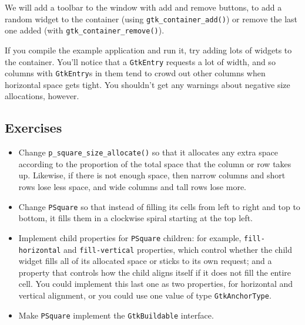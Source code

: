 \documentclass[%
			   halfparskip,smallheadings,pointlessnumbers]%
			   {scrartcl} %
\begin{document}
We will add a toolbar to the window with add and remove buttons, to add a random widget to the container (using \lstinline$gtk_container_add()$) or remove the last one added (with \lstinline$gtk_container_remove()$).

If you compile the example application and run it, try adding lots of widgets to the container. You'll notice that a \lstinline$GtkEntry$ requests a lot of width, and so columns with \lstinline$GtkEntry$s in them tend to crowd out other columns when horizontal space gets tight. You shouldn't get any warnings about negative size allocations, however.

\subsection{Exercises}

\begin{itemize}
\item Change \lstinline$p_square_size_allocate()$ so that it allocates any extra space according to the proportion of the total space that the column or row takes up. Likewise, if there is not enough space, then narrow columns and short rows lose less space, and wide columns and tall rows lose more.
\item Change \lstinline$PSquare$ so that instead of filling its cells from left to right and top to bottom, it fills them in a clockwise spiral starting at the top left.
\item Implement child properties for \lstinline$PSquare$ children: for example, \lstinline$fill-horizontal$ and \lstinline$fill-vertical$ properties, which control whether the child widget fills all of its allocated space or sticks to its own request; and a property that controls how the child aligns itself if it does not fill the entire cell. You could implement this last one as two properties, for horizontal and vertical alignment, or you could use one value of type \lstinline$GtkAnchorType$.
\item Make \lstinline$PSquare$ implement the \lstinline$GtkBuildable$ interface.
\end{itemize}
\end{document}
